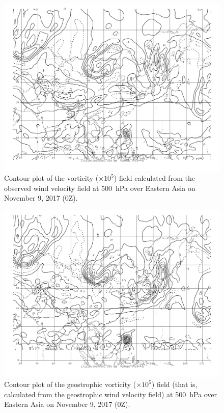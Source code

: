 \documentclass[11pt]{article}
\begin{document}
\begin{figure}[h!]
	\centering
	\includegraphics[width=\textwidth]{vorwnd_obs_500hPa_China}
	\caption{Contour plot of the vorticity ($\times 10^5$) field calculated from the observed wind velocity field at \SI{500}{\hecto\Pa} over Eastern Asia on November 9, 2017 (0Z).}
	\label{fig:vorwnd_obs_500hPa_China}
\end{figure}

\begin{figure}[h!]
	\centering
	\includegraphics[width=\textwidth]{vorgeo_500hPa_China}
	\caption{Contour plot of the geostrophic vorticity ($\times 10^5$) field (that is, calculated from the geostrophic wind velocity field) at \SI{500}{\hecto\Pa} over Eastern Asia on November 9, 2017 (0Z).}
	\label{fig:vorgeo_obs_500hPa_China}
\end{figure}
\end{document}
